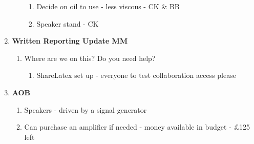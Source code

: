 \begin{enumerate}
\begin{enumerate}
\begin{enumerate}
\item  Decide on oil to use - less viscous - CK \& BB

\item  Speaker stand - CK\\
\end{enumerate}
\end{enumerate}

\item  \textbf{Written Reporting Update MM}

\begin{enumerate}
\item Where are we on this? Do you need help? 

\begin{enumerate}
\item  ShareLatex set up - everyone to test collaboration access please\\
\end{enumerate}
\end{enumerate}

\item  \textbf{AOB}

\begin{enumerate}
\item Speakers - driven by a signal generator

\item  Can purchase an amplifier if needed - money available in budget - $\mathsterling$125 left
\end{enumerate}
\end{enumerate}





